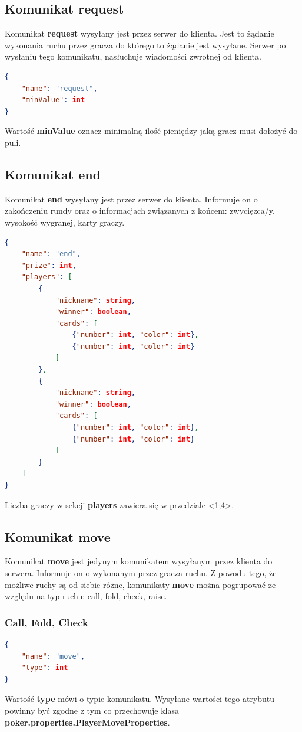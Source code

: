 \documentclass{article}
\begin{document}
    \subsection{Komunikat request}
        Komunikat \textbf{request} wysyłany jest przez serwer do klienta.
        Jest to żądanie wykonania ruchu przez gracza do którego to żądanie jest wysyłane.
        Serwer po wysłaniu tego komunikatu, nasłuchuje wiadomości zwrotnej od klienta.
    
        \begin{lstlisting}[language=json,firstnumber=1]
{
    "name": "request",
    "minValue": int
}
        \end{lstlisting}
        Wartość \textbf{minValue} oznacz minimalną ilość pieniędzy jaką gracz musi dołożyć do puli.
    
    \subsection{Komunikat end}
        Komunikat \textbf{end} wysyłany jest przez serwer do klienta.
        Informuje on o zakończeniu rundy oraz o informacjach związanych z końcem: zwycięzca/y, wysokość wygranej, karty graczy.
        \begin{lstlisting}[language=json,firstnumber=1]
{
    "name": "end",
    "prize": int,
    "players": [
        {
            "nickname": string,
            "winner": boolean,
            "cards": [
                {"number": int, "color": int},
                {"number": int, "color": int}
            ]
        },
        {
            "nickname": string,
            "winner": boolean,
            "cards": [
                {"number": int, "color": int},
                {"number": int, "color": int}
            ]
        }
    ]
}
        \end{lstlisting}
        Liczba graczy w sekcji \textbf{players} zawiera się w przedziale <1;4>.
    
    \subsection{Komunikat move}
        Komunikat \textbf{move} jest jedynym komunikatem wysyłanym przez klienta do serwera.
        Informuje on o wykonanym przez gracza ruchu.
        Z powodu tego, że możliwe ruchy są od siebie różne, komunikaty \textbf{move} można pogrupować ze względu na typ ruchu: call, fold, check, raise.
        
        \subsubsection{Call, Fold, Check}
            \begin{lstlisting}[language=json,firstnumber=1]
{
    "name": "move",
    "type": int
}
            \end{lstlisting}
            Wartość \textbf{type} mówi o typie komunikatu. Wysyłane wartości tego atrybutu powinny być zgodne z tym co przechowuje klasa \textbf{poker.properties.PlayerMoveProperties}.
\end{document}
